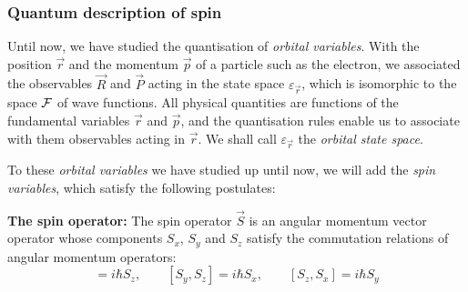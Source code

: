 \subsubsection{Quantum description of spin}

Until now, we have studied the quantisation of \textit{orbital variables}. With the position $\vec{r}$ and the momentum $\vec{p}$ of a particle such as the electron, we associated the observables $\vec{R}$ and $\vec{P}$ acting in the state space $\varepsilon_{\vec{r}}$, which is isomorphic to the space $\mathcal{F}$ of wave functions. All physical quantities are functions of the fundamental variables $\vec{r}$ and $\vec{p}$, and the quantisation rules enable us to associate with them observables acting in $\vec{r}$. We shall call $\varepsilon_{\vec{r}}$ the \textit{orbital state space}.

To these \textit{orbital variables} we have studied up until now, we will add the \textit{spin variables}, which satisfy the following postulates:

\begin{postulate}
    \textbf{The spin operator:} The spin operator $\vec{S}$ is an angular momentum vector operator whose components $S_x$, $S_y$ and $S_z$ satisfy the commutation relations of angular momentum operators:
    \begin{equation}
        [S_x, S_y] = i\hbar S_z, \qquad [S_y, S_z] = i\hbar S_x, \qquad [S_z, S_x] = i\hbar S_y
    \end{equation}
\end{postulate}

